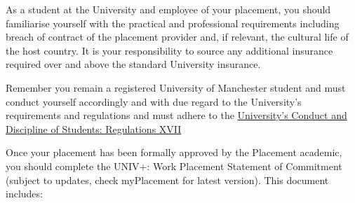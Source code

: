 \documentclass[
]{book}
\begin{document}
As a student at the University and employee of your placement, you should familiarise yourself with the practical and professional requirements including breach of contract of the placement provider and, if relevant, the cultural life of the host country. It is your responsibility to source any additional insurance required over and above the standard University
insurance.

Remember you remain a registered University of Manchester student and must conduct yourself accordingly and with due regard to the University's requirements and regulations and must adhere to the
\href{https://documents.manchester.ac.uk/DocuInfo.aspx?DocID=6530}{University's Conduct and Discipline of Students: Regulations XVII} \citep{regulations}

Once your placement has been formally approved by the Placement academic, you should complete the UNIV+: Work Placement Statement of Commitment (subject to updates, check myPlacement for latest version). This document includes:
\end{document}
